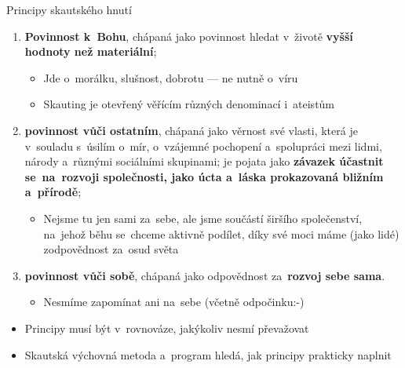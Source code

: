 \documentclass[compress, xelatex, 11pt, xcolor=dvipsnames, print, aspectratio=169,
	hyperref={
		bookmarks=true,
		unicode=true,
		colorlinks=true,
		pdftitle={Skautska vychovna metoda},
		plainpages=false,
		pdfauthor={Vojtech Zeisek},
		pdfsubject={Skautska vychovna metoda a jeji vyvoj za posledni stoleti a desetileti},
		pdfcreator={XeLaTeX},
		pdfkeywords={Junak, Pedagogika, Skaut, Skauting, Vychovna metoda},
		linkcolor=Red, %
		anchorcolor=ForestGreen, %
		citecolor=ForestGreen, %
		filecolor=ForestGreen, %
		menucolor=ForestGreen, %
		urlcolor=Sepia, %
		pdftex},
	url={hyphens, lowtilde} %
	]{beamer}
\begin{document}
\begin{frame}{Principy skautského hnutí}
	\begin{enumerate}
		\item \textbf{Povinnost k~Bohu}, chápaná jako povinnost hledat v~životě \textbf{vyšší hodnoty než materiální};
		\begin{itemize}
			\item Jde o~morálku, slušnost, dobrotu --- ne nutně o~víru
			\item Skauting je otevřený věřícím různých denominací i~ateistům
		\end{itemize}
		\item \textbf{povinnost vůči ostatním}, chápaná jako věrnost své vlasti, která je v~souladu s~úsilím o~mír, o~vzájemné pochopení a~spolupráci mezi lidmi, národy a~různými sociálními skupinami; je pojata jako \textbf{závazek účastnit se~na~rozvoji společnosti, jako úcta a~láska prokazovaná bližním a~přírodě};
		\begin{itemize}
			\item Nejsme tu jen sami za~sebe, ale jsme součástí širšího společenství, na~jehož běhu se~chceme aktivně podílet, díky své moci máme (jako lidé) zodpovědnost za~osud světa
		\end{itemize}
		\item \textbf{povinnost vůči sobě}, chápaná jako odpovědnost za~\textbf{rozvoj sebe sama}.
		\begin{itemize}
			\item Nesmíme zapomínat ani na~sebe (včetně odpočinku:-)
		\end{itemize}
	\end{enumerate}
	\vfill
	\begin{itemize}
		\item Principy musí být v~rovnováze, jakýkoliv nesmí převažovat
		\item Skautská výchovná metoda a~program hledá, jak principy prakticky naplnit
	\end{itemize}
\end{frame}
\end{document}
